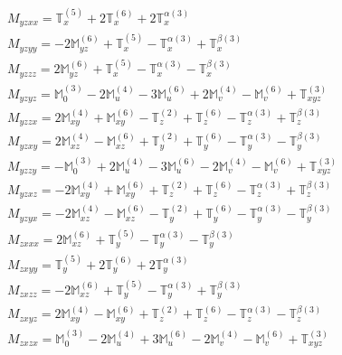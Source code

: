 \documentclass[fleqn,8pt,landscape]{jsarticle}
\begin{document}
\begin{align*}
& M_{yzxx} = \mathbb{T}_{x}^{(5)} + 2 \mathbb{T}_{x}^{(6)} + 2 \mathbb{T}_{x}^{\alpha(3)} \\
& M_{yzyy} = - 2 \mathbb{M}_{yz}^{(6)} + \mathbb{T}_{x}^{(5)} - \mathbb{T}_{x}^{\alpha(3)} + \mathbb{T}_{x}^{\beta(3)} \\
& M_{yzzz} = 2 \mathbb{M}_{yz}^{(6)} + \mathbb{T}_{x}^{(5)} - \mathbb{T}_{x}^{\alpha(3)} - \mathbb{T}_{x}^{\beta(3)} \\
& M_{yzyz} = \mathbb{M}_{0}^{(3)} - 2 \mathbb{M}_{u}^{(4)} - 3 \mathbb{M}_{u}^{(6)} + 2 \mathbb{M}_{v}^{(4)} - \mathbb{M}_{v}^{(6)} + \mathbb{T}_{xyz}^{(3)} \\
& M_{yzzx} = 2 \mathbb{M}_{xy}^{(4)} + \mathbb{M}_{xy}^{(6)} - \mathbb{T}_{z}^{(2)} + \mathbb{T}_{z}^{(6)} - \mathbb{T}_{z}^{\alpha(3)} + \mathbb{T}_{z}^{\beta(3)} \\
& M_{yzxy} = 2 \mathbb{M}_{xz}^{(4)} - \mathbb{M}_{xz}^{(6)} + \mathbb{T}_{y}^{(2)} + \mathbb{T}_{y}^{(6)} - \mathbb{T}_{y}^{\alpha(3)} - \mathbb{T}_{y}^{\beta(3)} \\
& M_{yzzy} = - \mathbb{M}_{0}^{(3)} + 2 \mathbb{M}_{u}^{(4)} - 3 \mathbb{M}_{u}^{(6)} - 2 \mathbb{M}_{v}^{(4)} - \mathbb{M}_{v}^{(6)} + \mathbb{T}_{xyz}^{(3)} \\
& M_{yzxz} = - 2 \mathbb{M}_{xy}^{(4)} + \mathbb{M}_{xy}^{(6)} + \mathbb{T}_{z}^{(2)} + \mathbb{T}_{z}^{(6)} - \mathbb{T}_{z}^{\alpha(3)} + \mathbb{T}_{z}^{\beta(3)} \\
& M_{yzyx} = - 2 \mathbb{M}_{xz}^{(4)} - \mathbb{M}_{xz}^{(6)} - \mathbb{T}_{y}^{(2)} + \mathbb{T}_{y}^{(6)} - \mathbb{T}_{y}^{\alpha(3)} - \mathbb{T}_{y}^{\beta(3)} \\
& M_{zxxx} = 2 \mathbb{M}_{xz}^{(6)} + \mathbb{T}_{y}^{(5)} - \mathbb{T}_{y}^{\alpha(3)} - \mathbb{T}_{y}^{\beta(3)} \\
& M_{zxyy} = \mathbb{T}_{y}^{(5)} + 2 \mathbb{T}_{y}^{(6)} + 2 \mathbb{T}_{y}^{\alpha(3)} \\
& M_{zxzz} = - 2 \mathbb{M}_{xz}^{(6)} + \mathbb{T}_{y}^{(5)} - \mathbb{T}_{y}^{\alpha(3)} + \mathbb{T}_{y}^{\beta(3)} \\
& M_{zxyz} = 2 \mathbb{M}_{xy}^{(4)} - \mathbb{M}_{xy}^{(6)} + \mathbb{T}_{z}^{(2)} + \mathbb{T}_{z}^{(6)} - \mathbb{T}_{z}^{\alpha(3)} - \mathbb{T}_{z}^{\beta(3)} \\
& M_{zxzx} = \mathbb{M}_{0}^{(3)} - 2 \mathbb{M}_{u}^{(4)} + 3 \mathbb{M}_{u}^{(6)} - 2 \mathbb{M}_{v}^{(4)} - \mathbb{M}_{v}^{(6)} + \mathbb{T}_{xyz}^{(3)} \\

\end{align*}
\end{document}
